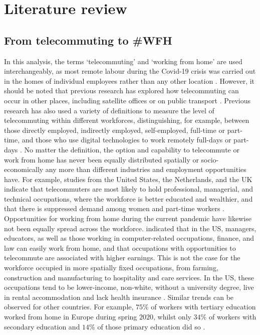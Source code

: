 \documentclass[]{interact}
\theoremstyle{plain}%
\theoremstyle{definition}
\theoremstyle{remark}
\begin{document}
\hypertarget{literature-review}{%
\section{Literature review}\label{literature-review}}

\hypertarget{from-telecommuting-to-wfh}{%
\subsection{From telecommuting to
\#WFH}\label{from-telecommuting-to-wfh}}

In this analysis, the terms `telecommuting' and `working from home' are
used interchangeably, as most remote labour during the Covid-19 crisis
was carried out in the homes of individual employees rather than any
other location \citep{eurofound2020}. However, it should be noted that
previous research has explored how telecommuting can occur in other
places, including satellite offices or on public transport
\citep{felstead2012rapid, siha2006telecommuting}. Previous research has
also used a variety of definitions to measure the level of telecommuting
within different workforces, distinguishing, for example, between those
directly employed, indirectly employed, self-employed, full-time or
part-time, and those who use digital technologies to work remotely
full-days or part-days
\citep{allen2015effective, bailey2002review, haddad2009examination}. No
matter the definition, the option and capability to telecommute or work
from home has never been equally distributed spatially or
socio-economically any more than different industries and employment
opportunities have. For example, studies from the United States, the
Netherlands, and the UK indicate that telecommuters are most likely to
hold professional, managerial, and technical occupations, where the
workforce is better educated and wealthier, and that there is suppressed
demand among women and part-time workers
\citep{headicar2016move, peters2004employees, singh2013modeling}.
Opportunities for working from home during the current pandemic have
likewise not been equally spread across the workforce.
\citet{NBERw26948} indicated that in the US, managers, educators, as
well as those working in computer-related occupations, finance, and law
can easily work from home, and that occupations with opportunities to
telecommute are associated with higher earnings. This is not the case
for the workforce occupied in more spatially fixed occupations, from
farming, construction and manufacturing to hospitality and care
services. In the US, these occupations tend to be lower-income,
non-white, without a university degree, live in rental accommodation and
lack health insurance \citep{NBERw27085}. Similar trends can be observed
for other countries. For example, \(75\)\% of workers with tertiary
education worked from home in Europe during spring \(2020\), whilst only
\(34\)\% of workers with secondary education and \(14\)\% of those
primary education did so \citep{eurofound2020}.
\end{document}
